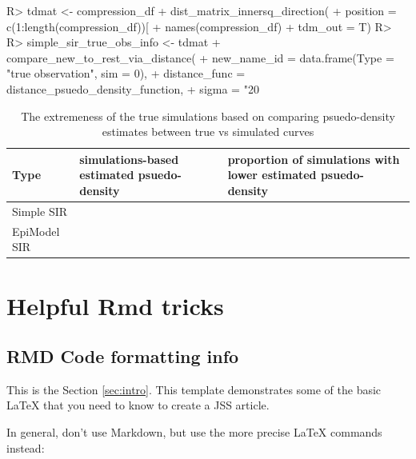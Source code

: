\documentclass[
  shortnames]{jss}
\begin{document}
\begin{CodeChunk}
\begin{CodeInput}
R> tdmat <- compression_df %
+   dist_matrix_innersq_direction(
+     position = c(1:length(compression_df))[
+       names(compression_df) %
+     tdm_out = T)
R> 
R> simple_sir_true_obs_info <- tdmat %
+   compare_new_to_rest_via_distance(
+     new_name_id = data.frame(Type = "true observation", sim = 0),
+     distance_func = distance_psuedo_density_function, 
+     sigma = "20%
\end{CodeInput}
\end{CodeChunk}

\begin{CodeChunk}
\begin{table}[!h]

\caption{\label{tab:hags-extreme}The extremeness of the true simulations based on comparing psuedo-density estimates between true vs simulated curves}
\centering
\begin{tabular}[t]{l>{\raggedleft\arraybackslash}p{6cm}>{\raggedleft\arraybackslash}p{6cm}}
\toprule
Type & simulations-based estimated psuedo-density & proportion of simulations with lower estimated psuedo-density\\
\midrule
Simple SIR & 0.0036733 & 0\\
EpiModel SIR & 0.0028813 & 0\\
\bottomrule
\end{tabular}
\end{table}

\end{CodeChunk}

\hypertarget{helpful-rmd-tricks}{%
\section{Helpful Rmd tricks}\label{helpful-rmd-tricks}}

\hypertarget{rmd-code-formatting-info}{%
\subsection{RMD Code formatting info}\label{rmd-code-formatting-info}}

This is the Section \ref{sec:intro}. This template demonstrates some of
the basic LaTeX that you need to know to create a JSS article.

In general, don't use Markdown, but use the more precise LaTeX commands
instead:
\end{document}
